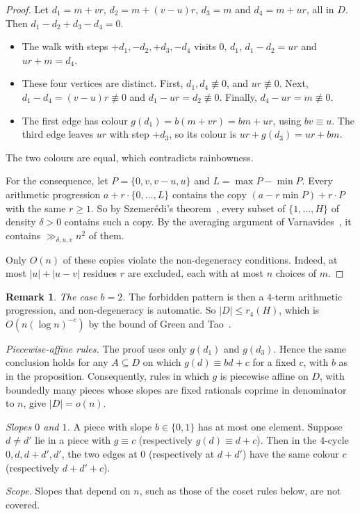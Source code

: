 \documentclass[11pt]{amsart}
\theoremstyle{definition}
\newtheorem{remark}[theorem]{Remark}
\begin{document}
\begin{proof}
Let $d_1=m+vr$, $d_2=m+(v-u)r$, $d_3=m$ and $d_4=m+ur$, all in $D$. Then
$d_1-d_2+d_3-d_4=0$.
\begin{itemize}
\item The walk with steps $+d_1,-d_2,+d_3,-d_4$ visits $0$, $d_1$, $d_1-d_2=ur$ and
  $ur+m=d_4$.
\item These four vertices are distinct. First, $d_1,d_4\not\equiv0$, and $ur\not\equiv0$.
  Next, $d_1-d_4=(v-u)r\not\equiv0$ and $d_1-ur=d_2\not\equiv0$. Finally,
  $d_4-ur=m\not\equiv0$.
\item The first edge has colour $g(d_1)=b(m+vr)=bm+ur$, using $bv\equiv u$. The third edge
  leaves $ur$ with step $+d_3$, so its colour is $ur+g(d_3)=ur+bm$.
\end{itemize}
The two colours are equal, which contradicts rainbowness.

For the consequence, let $P=\{0,v,v-u,u\}$ and $L=\max P-\min P$. Every arithmetic
progression $a+r\cdot\{0,\dots,L\}$ contains the copy $(a-r\min P)+r\cdot P$ with the same
$r\ge1$. So by Szemer\'edi's theorem~\cite{Sz75}, every subset of $\{1,\dots,H\}$ of density
$\delta>0$ contains such a copy. By the averaging argument of Varnavides~\cite{Var59}, it
contains $\gg_{\delta,u,v} n^2$ of them.

Only $O(n)$ of these copies violate the non-degeneracy conditions. Indeed, at most
$|u|+|u-v|$ residues $r$ are excluded, each with at most $n$ choices of $m$.
\end{proof}

\begin{remark}
\emph{The case $b=2$.} The forbidden pattern is then a $4$-term arithmetic progression, and
non-degeneracy is automatic. So $|D|\le r_4(H)$, which is $O(n(\log n)^{-c})$ by the bound of
Green and Tao~\cite{GT17}.

\emph{Piecewise-affine rules.} The proof uses only $g(d_1)$ and $g(d_3)$. Hence the same
conclusion holds for any $A\subseteq D$ on which $g(d)\equiv bd+c$ for a fixed $c$, with $b$
as in the proposition. Consequently, rules in which $g$ is piecewise affine on $D$, with
boundedly many pieces whose slopes are fixed rationals coprime in denominator to $n$, give
$|D|=o(n)$.

\emph{Slopes $0$ and $1$.} A piece with slope $b\in\{0,1\}$ has at most one element. Suppose
$d\ne d'$ lie in a piece with $g\equiv c$ (respectively $g(d)\equiv d+c$). Then in the
$4$-cycle $0,d,d+d',d'$, the two edges at $0$ (respectively at $d+d'$) have the same colour
$c$ (respectively $d+d'+c$).

\emph{Scope.} Slopes that depend on $n$, such as those of the coset rules below, are not
covered.
\end{remark}
\end{document}
